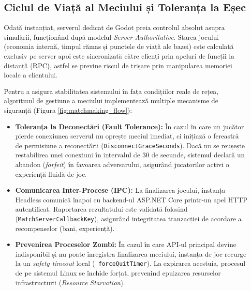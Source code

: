 \subsection{Ciclul de Viață al Meciului și Toleranța la Eșec}
Odată instanțiat, serverul dedicat de Godot preia controlul absolut asupra simulării, funcționând după modelul \textit{Server-Authoritative}. Starea jocului (economia internă, timpul rămas și punctele de viață ale bazei) este calculată exclusiv pe server apoi este sincronizată către clienți prin apeluri de funcții la distanță (RPC), astfel se previne riscul de trișare prin manipularea memoriei locale a clientului.

Pentru a asigura stabilitatea sistemului în fața condițiilor reale de rețea, algoritmul de gestiune a meciului implementează multiple mecanisme de siguranță (Figura \ref{fig:matchmaking_flow}):
\begin{itemize}
    \item \textbf{Toleranța la Deconectări (Fault Tolerance):} În cazul în care un jucător pierde conexiunea serverul nu oprește meciul imediat, ci inițiază o fereastră de permisiune a reconectării (\texttt{Disconnect\-Grace\-Seconds}).  Dacă nu se reușește restabilirea unei conexiuni în intervalul de 30 de secunde, sistemul declară un abandon (\textit{forfeit}) în favoarea adversarului, asigurând jucatorilor activi o experiență fluidă de joc.
    \item \textbf{Comunicarea Inter-Procese (IPC):} La finalizarea jocului, instanța Headless comunică înapoi cu backend-ul ASP.NET Core printr-un apel HTTP autentificat. Raportarea rezultatului este validată folosind (\texttt{MatchServerCallbackKey}), asigurând integritatea tranzacției de acordare a recompenselor (bani, experiență).
    \item \textbf{Prevenirea Proceselor Zombi:} În cazul în care API-ul principal devine indisponibil și nu poate înregistra finalizarea meciului, instanța de joc recurge la un \textit{safety timeout} local (\texttt{\_forceQuitTimer}). La expirarea acestuia, procesul de pe sistemul Linux se închide forțat, prevenind epuizarea resurselor infrastructurii (\textit{Resource Starvation}).
\end{itemize}

